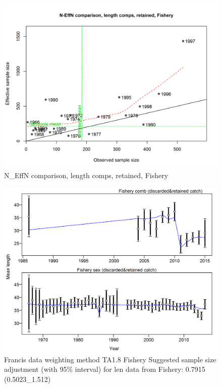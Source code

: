 \documentclass[12pt,]{article}
\begin{document}
\begin{figure}
\centering
\includegraphics{./r4ss/plots_mod1/comp_lenfit_sampsize_flt1mkt2.png}
\caption{N\_EffN comparison, length comps, retained, Fishery
\label{fig:mod1_8_comp_lenfit_sampsize_flt1mkt2}}
\end{figure}

\begin{figure}
\centering
\includegraphics{./r4ss/plots_mod1/comp_lenfit_data_weighting_TA1.8_Fishery.png}
\caption{Francis data weighting method TA1.8 Fishery Suggested sample
size adjustment (with 95\% interval) for len data from Fishery: 0.7915
(0.5023\_1.512)
\label{fig:mod1_9_comp_lenfit_data_weighting_TA1.8_Fishery}}
\end{figure}
\end{document}
